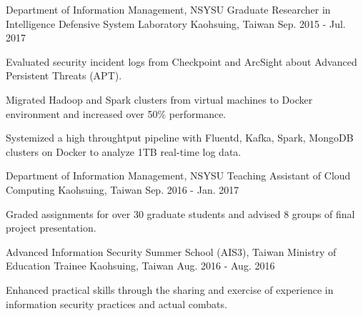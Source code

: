 


\begin{cventries}


\cventry
{Department of Information Management, NSYSU} %
{Graduate Researcher in Intelligence Defensive System Laboratory} %
{Kaohsuing, Taiwan} %
{Sep. 2015 - Jul. 2017} %
{ %
\begin{cvitems}
\item {Evaluated security incident logs from Checkpoint and ArcSight about Advanced Persistent Threats (APT).}
\item {Migrated Hadoop and Spark clusters from virtual machines to Docker environment and increased over 50\% performance.}
\item {Systemized a high throughtput pipeline with Fluentd, Kafka, Spark, MongoDB clusters on Docker to analyze 1TB real-time log data.}
\end{cvitems}
}


\cventry
{Department of Information Management, NSYSU} %
{Teaching Assistant of Cloud Computing} %
{Kaohsuing, Taiwan} %
{Sep. 2016 - Jan. 2017} %
{ %
\begin{cvitems}
\item {Graded assignments for over 30 graduate students and advised 8 groups of final project presentation.}
\end{cvitems}
}


\cventry
{Advanced Information Security Summer School (AIS3), Taiwan Ministry of Education} %
{Trainee} %
{Kaohsuing, Taiwan} %
{Aug. 2016 - Aug. 2016} %
{ %
\begin{cvitems}
\item {Enhanced practical skills through the sharing and exercise of experience in information security practices and actual combats.}
\end{cvitems}
}


\end{cventries}
